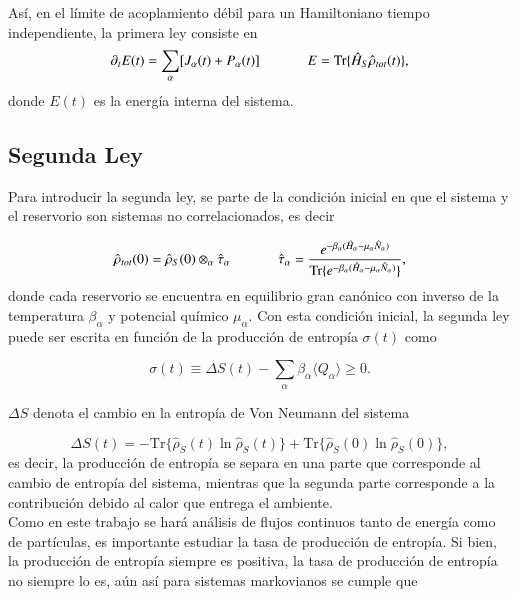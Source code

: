 Así, en el límite de acoplamiento débil para un Hamiltoniano tiempo independiente, la primera ley consiste en 
\begin{equation*}
    \partial_{t}E(t) = \sum_{\alpha}[J_{\alpha}(t) + P_{\alpha}(t) ] \hspace{12mm} E = \text{Tr}\{\hat{H}_{S}\hat{\rho}_{tot}(t) \},
\end{equation*}
donde $E(t)$ es la energía interna del sistema.


\subsection{Segunda Ley}
Para introducir la segunda ley, se parte de la condición inicial en que el sistema y el reservorio son sistemas no correlacionados, es decir 

\begin{equation*}
    \hat{\rho}_{tot}(0) = \hat{\rho}_{S}(0)\otimes_{\alpha}\hat{\tau}_{\alpha} \hspace{12mm} \hat{\tau}_{\alpha} = \frac{e^{-\beta_{\alpha}(\hat{H}_{\alpha}-\mu_{\alpha}\hat{N}_{\alpha}) }}{ \text{Tr}\{e^{-\beta_{\alpha}(\hat{H}_{\alpha} - \mu_{\alpha}\hat{N}_{\alpha})}\} },
\end{equation*}
donde cada reservorio se encuentra en equilibrio gran canónico con inverso de la temperatura $\beta_{\alpha}$ y potencial químico $\mu_{\alpha}$. Con esta condición inicial, la segunda ley puede ser escrita en función de la producción de entropía $\sigma(t)$ como \cite{esposito2010entropy}

\begin{equation*}
    \sigma(t) \equiv \Delta S(t) - \sum_{\alpha}\beta_{\alpha}\langle Q_{\alpha}\rangle \geq 0.
\end{equation*}

$\Delta S$ denota el cambio en la entropía de Von Neumann del sistema

\begin{equation*}
    \Delta S(t) = -  \text{Tr}\{\hat{\rho}_{S}(t)\ln \hat{\rho}_{S}(t) \} +  \text{Tr}\{ \hat{\rho}_{S}(0)\ln \hat{\rho}_{S}(0) \},
\end{equation*}
es decir, la producción de entropía se separa en una parte que corresponde al cambio de entropía del sistema, mientras que la segunda parte corresponde a la contribución debido al calor que entrega el ambiente.\\
Como en este trabajo se hará análisis de flujos continuos tanto de energía como de partículas, es importante estudiar la tasa de producción de entropía. Si bien, la producción de entropía siempre es positiva, la tasa de producción de entropía no siempre lo es, aún así para sistemas markovianos se cumple que \cite{strasberg2019non}

